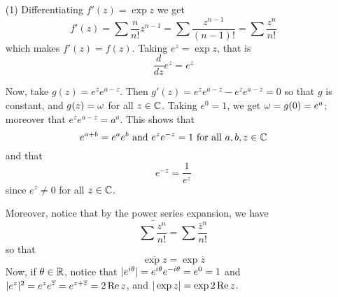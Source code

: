 \begin{example}\label{example_3.4}
    \begin{enumerate}
        \item[(1)] Differentiating $f'(z)=\exp{z}$ we get
            \begin{equation*}
                f'(z)=\sum{\frac{n}{n!}z^{n-1}}=\sum{\frac{z^{n-1}}{(n-1)!}}=
                \sum{\frac{z^n}{n!}}
            \end{equation*}
            which makes $f'(z)=f(z)$. Taking $e^z=\exp{z}$, that is
            \begin{equation*}
                \frac{d}{dz}{e^z}=e^z
            \end{equation*}

            Now, take $g(z)=e^ze^{a-z}$. Then $g'(z)=e^ze^{a-z}-e^ze^{a-z}=0$ so
            that $g$ is constant, and $g(z)=\omega$ for all $z \in \mathbb{C}$. Taking
            $e^0=1$, we get $\omega=g(0)=e^a$; moreover that $e^ze^{a-z}=a^a$. This
            shows that
            \begin{equation*}
                e^{a+b}=e^ae^b \text{ and } e^ze^{-z}=1 \text{ for all } a,b,z
                \in \mathbb{C}
            \end{equation*}
            and that
            \begin{equation*}
                e^{-z}=\frac{1}{e^z}
            \end{equation*}
            since $e^z \neq 0$ for all $z \in \mathbb{C}$.

            Moreover, notice that by the power series expansion, we have
            \begin{equation*}
                \bar{\sum{\frac{z^n}{n!}}}=\sum{\frac{\bar{z}^n}{n!}}
            \end{equation*}
            so that
            \begin{equation*}
                \bar{\exp{z}}=\exp{\bar{z}}
            \end{equation*}
            Now, if $\theta \in \mathbb{R}$, notice that
            $|e^{i\theta}|=e^{i\theta}e^{-i\theta}=e^0=1$ and
            $|e^z|^2=e^ze^{\overline{z}}=e^{z+\overline{z}}=2\operatorname{Re}{z}$, and
            $|\exp{z}|=\exp{2\operatorname{Re}{z}}$.


\end{enumerate}
\end{example}
